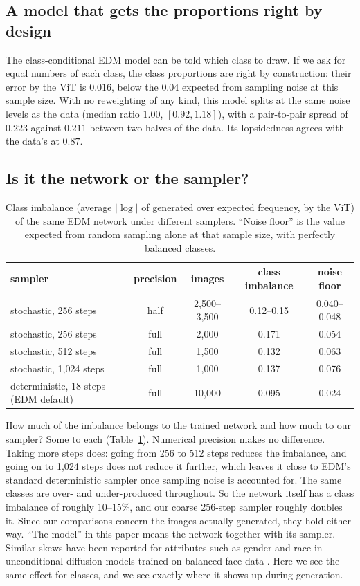 \documentclass[11pt]{article}
\begin{document}
\subsection{A model that gets the proportions right by design}

The class-conditional EDM model can be told which class to draw. If we ask for equal numbers of each class, the class proportions are right by construction: their error by the ViT is $0.016$, below the $0.04$ expected from sampling noise at this sample size. With no reweighting of any kind, this model splits at the same noise levels as the data (median ratio $1.00$, $[0.92,1.18]$), with a pair-to-pair spread of $0.223$ against $0.211$ between two halves of the data. Its lopsidedness agrees with the data's at $0.87$.

\subsection{Is it the network or the sampler?}
\label{sec:sampler}

\begin{table}[t]
\centering
\caption{Class imbalance (average $|\log|$ of generated over expected frequency, by the ViT) of the same EDM network under different samplers. ``Noise floor'' is the value expected from random sampling alone at that sample size, with perfectly balanced classes.}
\label{tab:sampler}
\small
\begin{tabular}{lcccc}
\toprule
sampler & precision & images & class imbalance & noise floor \\
\midrule
stochastic, 256 steps & half & 2{,}500--3{,}500 & 0.12--0.15 & 0.040--0.048 \\
stochastic, 256 steps & full & 2{,}000 & 0.171 & 0.054 \\
stochastic, 512 steps & full & 1{,}500 & 0.132 & 0.063 \\
stochastic, 1{,}024 steps & full & 1{,}000 & 0.137 & 0.076 \\
deterministic, 18 steps (EDM default) & full & 10{,}000 & 0.095 & 0.024 \\
\bottomrule
\end{tabular}
\end{table}

How much of the imbalance belongs to the trained network and how much to our sampler? Some to each (Table~\ref{tab:sampler}). Numerical precision makes no difference. Taking more steps does: going from 256 to 512 steps reduces the imbalance, and going on to 1{,}024 steps does not reduce it further, which leaves it close to EDM's standard deterministic sampler once sampling noise is accounted for. The same classes are over- and under-produced throughout. So the network itself has a class imbalance of roughly 10--15\%, and our coarse 256-step sampler roughly doubles it. Since our comparisons concern the images actually generated, they hold either way. ``The model'' in this paper means the network together with its sampler. Similar skews have been reported for attributes such as gender and race in unconditional diffusion models trained on balanced face data \citep{perera2023analyzing,pal2023gaussian}. Here we see the same effect for classes, and we see exactly where it shows up during generation.
\end{document}

